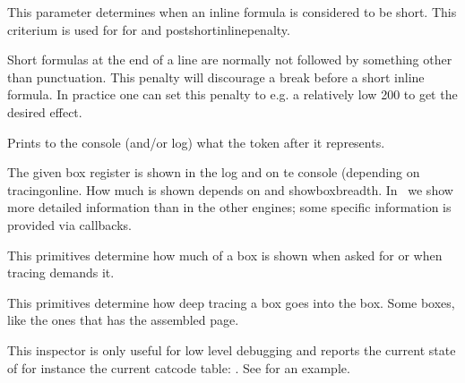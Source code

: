 \stopoldprimitive

\startnewprimitive[title={\prm {shortinlinemaththreshold}}]

This parameter determines when an inline formula is considered to be short. This
criterium is used for for  and \prm
{postshortinlinepenalty}.

\stopnewprimitive

\startnewprimitive[title={\prm {shortinlineorphanpenalty}}]

Short formulas at the end of a line are normally not followed by something other
than punctuation. This penalty will discourage a break before a short inline
formula. In practice one can set this penalty to e.g. a relatively low 200 to get
the desired effect.

\stopnewprimitive

\startoldprimitive[title={\prm {show}}]

Prints to the console (and/or log) what the token after
it represents.

\stopoldprimitive

\startoldprimitive[title={\prm {showbox}}]

The given box register is shown in the log and on te console (depending on \prm
{tracingonline}. How much is shown depends on  and \prm
{showboxbreadth}. In \LUAMETATEX\ we show more detailed information than in the
other engines; some specific information is provided via callbacks.

\stopoldprimitive

\startoldprimitive[title={\prm {showboxbreadth}}]

This primitives determine how much of a box is shown when asked for or when
tracing demands it.

\stopoldprimitive

\startoldprimitive[title={\prm {showboxdepth}}]

This primitives determine how deep tracing a box goes into the box. Some boxes,
like the ones that has the assembled page.

\stopoldprimitive

\startnewprimitive[title={\prm {showcodestack}}]

This inspector is only useful for low level debugging and reports the current
state of for instance the current catcode table: \typ {\showcodestack \catcode}.
See  for an example.

\stopnewprimitive

